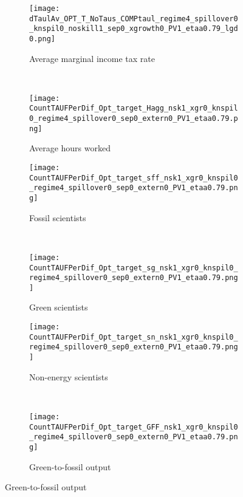 	\thispagestyle{empty}
	\begin{figure}[h!!!]
		\centering
		\caption{Optimal combined policy versus only optimal carbon tax: homogeneous skills}\label{fig:opt_Count_homskill}
		\begin{subfigure}{0.4\textwidth}
			\caption{Average marginal income tax rate }
			\texttt{[image: dTaulAv\_OPT\_T\_NoTaus\_COMPtaul\_regime4\_spillover0\_knspil0\_noskill1\_sep0\_xgrowth0\_PV1\_etaa0.79\_lgd0.png]}
		\end{subfigure}
		\begin{minipage}[]{0.1\textwidth}
			\
		\end{minipage}
		\begin{subfigure}{0.4\textwidth}
			\caption{Average hours worked}
			\texttt{[image: CountTAUFPerDif\_Opt\_target\_Hagg\_nsk1\_xgr0\_knspil0\_regime4\_spillover0\_sep0\_extern0\_PV1\_etaa0.79.png]}
		\end{subfigure}
		
		\begin{subfigure}{0.4\textwidth}
			\caption{Fossil scientists}
			\texttt{[image: CountTAUFPerDif\_Opt\_target\_sff\_nsk1\_xgr0\_knspil0\_regime4\_spillover0\_sep0\_extern0\_PV1\_etaa0.79.png]}
		\end{subfigure}
		\begin{minipage}[]{0.1\textwidth}
			\
		\end{minipage}
		\begin{subfigure}{0.4\textwidth}
			\caption{Green scientists}
			\texttt{[image: CountTAUFPerDif\_Opt\_target\_sg\_nsk1\_xgr0\_knspil0\_regime4\_spillover0\_sep0\_extern0\_PV1\_etaa0.79.png]}
		\end{subfigure}
		
		\begin{subfigure}{0.4\textwidth}
			\caption{Non-energy scientists}
			\texttt{[image: CountTAUFPerDif\_Opt\_target\_sn\_nsk1\_xgr0\_knspil0\_regime4\_spillover0\_sep0\_extern0\_PV1\_etaa0.79.png]}
		\end{subfigure}
		\begin{minipage}[]{0.1\textwidth}
			\
		\end{minipage}
		\begin{subfigure}{0.4\textwidth}
			\caption{Green-to-fossil output}
			\texttt{[image: CountTAUFPerDif\_Opt\_target\_GFF\_nsk1\_xgr0\_knspil0\_regime4\_spillover0\_sep0\_extern0\_PV1\_etaa0.79.png]}
		\end{subfigure}
	\end{figure}
	


